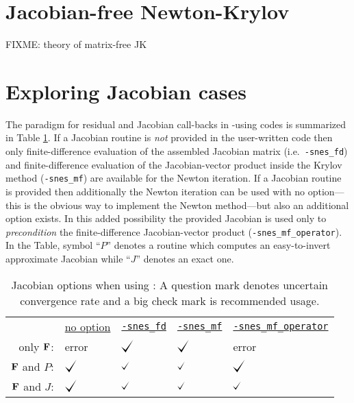 



\section{Jacobian-free Newton-Krylov} \label{sec:JFNK}

FIXME: theory of matrix-free JK \citep{KnollKeyes2004}


\section{Exploring Jacobian cases} \label{sec:jacobiancases}

\def\checkmark{\tikz\fill[scale=0.4](0,.35) -- (.25,0) -- (.7,.8) -- (.25,.15) -- cycle;}
\def\bigcheckmark{\tikz\fill[scale=0.6](0,.35) -- (.25,0) -- (.7,.8) -- (.25,.15) -- cycle;}

The paradigm for residual and Jacobian call-backs in \pSNES-using codes is summarized in Table \ref{tab:snesjacobianoptions}.  If a Jacobian routine is \emph{not} provided in the user-written code then only finite-difference evaluation of the assembled Jacobian matrix (i.e.~\texttt{-snes\_fd}) and finite-difference evaluation of the Jacobian-vector product inside the Krylov method (\texttt{-snes\_mf}) are available for the Newton iteration.  If a Jacobian routine is provided then additionally the Newton iteration can be used with no option---this is the obvious way to implement the Newton method---but also an additional option exists.  In this added possibility the provided Jacobian is used only to \emph{precondition} the finite-difference Jacobian-vector product (\texttt{-snes\_mf\_operator}).  In the Table, symbol ``$P$'' denotes a routine which computes an easy-to-invert approximate Jacobian while ``$J$'' denotes an exact one.
\begin{table}
\begin{tabular}{rllll}
 &\underline{no option}\hspace{0.0in} & \underline{\texttt{-snes\_fd}} & \underline{\texttt{-snes\_mf}} & \underline{\texttt{-snes\_mf\_operator}} \\
only $\mathbf{F}$:      & error           & $\bigcheckmark$ & $\bigcheckmark$ & error \\
$\mathbf{F}$ and $P$:   & $\bigcheckmark$ & $\checkmark$    & $\checkmark$    & $\bigcheckmark$ \\
$\mathbf{F}$ and $J$:   & $\bigcheckmark$ & $\checkmark$    & $\checkmark$    & $\checkmark$
\end{tabular}
\caption{Jacobian options when using \pSNES:  A question mark denotes uncertain convergence rate and a big check mark is recommended usage.} \label{tab:snesjacobianoptions}
\end{table}

